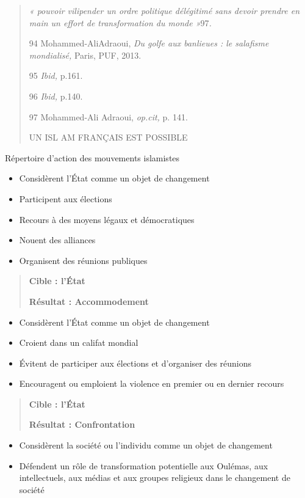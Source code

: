 \begin{quote}
\emph{« pouvoir vilipender un ordre politique délégitimé sans devoir
prendre en main un effort de transformation du monde »}97\emph{.}

94 Mohammed-AliAdraoui, \emph{Du golfe aux banlieues : le salafisme
mondialisé,} Paris, PUF, 2013.

95 \emph{Ibid,} p.161.

96 \emph{Ibid,} p.140.

97 Mohammed-Ali Adraoui, \emph{op.cit,} p. 141.

UN ISL AM FRANÇAIS EST POSSIBLE
\end{quote}

Répertoire d'action des mouvements islamistes

\begin{itemize}
\item
  Considèrent l'État comme un objet de changement
\item
  Participent aux élections
\item
  Recours à des moyens légaux et démocratiques
\item
  Nouent des alliances
\item
  Organisent des réunions publiques
\end{itemize}

\begin{quote}
\textbf{Cible : l'État}

\textbf{Résultat : Accommodement}
\end{quote}

\begin{itemize}
\item
  Considèrent l'État comme un objet de changement
\item
  Croient dans un califat mondial
\item
  Évitent de participer aux élections et d'organiser des réunions
\item
  Encouragent ou emploient la violence en premier ou en dernier recours
\end{itemize}

\begin{quote}
\textbf{Cible : l'État}

\textbf{Résultat : Confrontation}
\end{quote}

\begin{itemize}
\item
  Considèrent la société ou l'individu comme un objet de changement
\item
  Défendent un rôle de transformation potentielle aux Oulémas, aux
  intellectuels, aux médias et aux groupes religieux dans le changement
  de société
\end{itemize}

